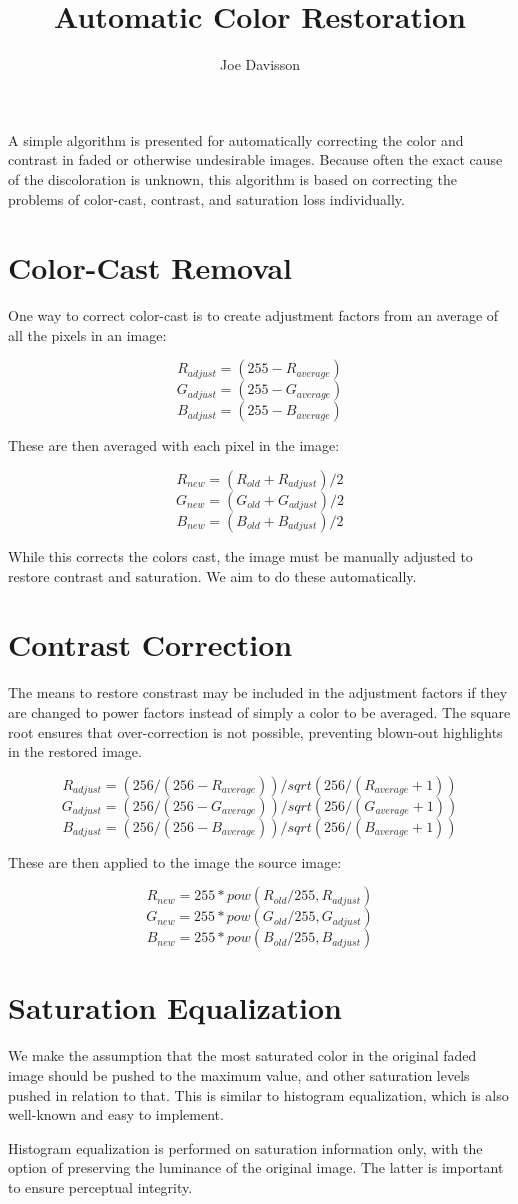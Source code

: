 \documentclass{article}
\title{Automatic Color Restoration}
\author{Joe Davisson} %
\begin{document}
\maketitle

A simple algorithm is presented for automatically correcting the
color and contrast in faded or otherwise undesirable images.
Because often the exact cause of the discoloration is unknown, this
algorithm is based on correcting the problems of color-cast,
contrast, and saturation loss individually.

\section{Color-Cast Removal}

One way to correct color-cast is to create adjustment factors from an
average of all the pixels in an image:

\[ R_{adjust} = (255 - R_{average}) \]
\[ G_{adjust} = (255 - G_{average}) \]
\[ B_{adjust} = (255 - B_{average}) \]

These are then averaged with each pixel in the image:

\[ R_{new} = (R_{old} + R_{adjust}) / 2 \]
\[ G_{new} = (G_{old} + G_{adjust}) / 2 \]
\[ B_{new} = (B_{old} + B_{adjust}) / 2 \]

While this corrects the colors cast, the image must be manually adjusted
to restore contrast and saturation. We aim to do these automatically.

\section{Contrast Correction}

The means to restore constrast may be included in the adjustment factors if
they are changed to power factors instead of simply a color to be averaged.
The square root ensures that over-correction is not possible, preventing
blown-out highlights in the restored image.

\[ R_{adjust} = (256 / (256 - R_{average})) / sqrt(256 / (R_{average} + 1)) \]
\[ G_{adjust} = (256 / (256 - G_{average})) / sqrt(256 / (G_{average} + 1)) \]
\[ B_{adjust} = (256 / (256 - B_{average})) / sqrt(256 / (B_{average} + 1)) \]

These are then applied to the image the source image:

\[ R_{new} = 255 * pow(R_{old} / 255, R_{adjust}) \]
\[ G_{new} = 255 * pow(G_{old} / 255, G_{adjust}) \]
\[ B_{new} = 255 * pow(B_{old} / 255, B_{adjust}) \]

\section{Saturation Equalization}

We make the assumption that the most saturated color in the original faded
image should be pushed to the maximum value, and other saturation levels pushed in relation to that. This is similar to histogram equalization, which is also
well-known and easy to implement.

Histogram equalization is performed on saturation information only, with the option of preserving the luminance of the original image. The latter is important to ensure perceptual integrity.
\end{document}
